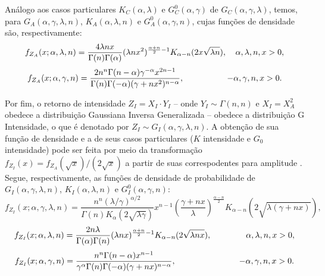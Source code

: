 \documentclass[12pt]{article}
\begin{document}
Análogo aos casos particulares $K_C(\alpha, \lambda)$ e $G_C^0(\alpha, \gamma)$ de $G_C(\alpha, \gamma, \lambda)$, temos, para $G_A(\alpha, \gamma, \lambda, n)$, $K_A(\alpha, \lambda, n)$ e $G_A^0(\alpha, \gamma, n)$, cujas funções de densidade são, respectivamente:
\begin{displaymath}
    f_{Z_A}(x; \alpha, \lambda, n) = \frac{4\lambda nx}{\Gamma(n)\Gamma(\alpha)} (\lambda nx^2)^{\frac{\alpha + n}{2}-1} K_{\alpha - n}(2x\sqrt{\lambda n}), \hspace{0.03\linewidth} \alpha, \lambda, n, x > 0,
\end{displaymath}
\begin{displaymath}
    f_{Z_A}(x; \alpha, \gamma, n) = \frac{2n^n \Gamma(n - \alpha) \gamma^{-\alpha} x^{2n-1}}{\Gamma(n) \Gamma(-\alpha)(\gamma + nx^2)^{n - \alpha}}, \hspace{0.15\linewidth} -\alpha, \gamma, n, x > 0.
\end{displaymath}

Por fim, o retorno de intensidade $Z_I = X_I \cdot Y_I$ -- onde $Y_I \sim \Gamma(n, n)$ e $X_I = X_A^2$ obedece a distribuição Gaussiana Inversa Generalizada -- obedece a distribuição G Intensidade, o que é denotado por $Z_I \sim G_I(\alpha, \gamma, \lambda, n)$. A obtenção de sua função de densidade e a de seus casos particulares ($K$ intensidade e $G_0$ intensidade) pode ser feita por meio da transformação $f_{Z_I}(x) = f_{Z_A}(\sqrt{x})/(2\sqrt{x})$  a partir de suas correspodentes para amplitude \cite{frery97}. Segue, respectivamente, as funções de densidade de probabilidade de $G_I(\alpha, \gamma, \lambda, n)$, $K_I(\alpha, \lambda, n)$ e $G_I^0(\alpha, \gamma, n)$:
\begin{displaymath}
    f_{Z_I}(x; \alpha, \gamma, \lambda, n) = \frac{n^n(\lambda/\gamma)^{\alpha/2}}{\Gamma(n) K_{\alpha}(2\sqrt{\lambda \gamma})} x^{n-1} \left( \frac{\gamma + nx}{\lambda} \right)^{\frac{\alpha - n}{2}} K_{\alpha - n}(2\sqrt{\lambda(\gamma + nx)}),
\end{displaymath}
\begin{displaymath}
    f_{Z_I}(x; \alpha, \lambda, n) = \frac{2n\lambda}{\Gamma(\alpha) \Gamma(n)} (\lambda nx)^{\frac{\alpha + n}{2}-1} K_{\alpha - n}(2\sqrt{\lambda nx}), \hspace{0.12\linewidth} \alpha, \lambda, n, x > 0,
\end{displaymath}
\begin{displaymath}
    f_{Z_I}(x; \alpha, \gamma, n) = \frac{n^n \Gamma(n - \alpha) x^{n-1}}{\gamma^{\alpha} \Gamma(n) \Gamma(-\alpha) (\gamma + nx)^{n-\alpha}}, \hspace{0.22\linewidth} -\alpha, \gamma, n, x > 0.
\end{displaymath}
\end{document}
